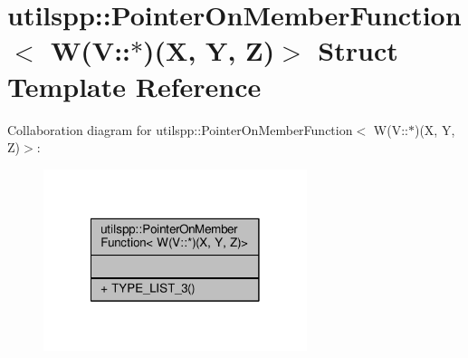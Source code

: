 \hypertarget{structutilspp_1_1PointerOnMemberFunction_3_01W_07V_1_1_5_08_07X_00_01Y_00_01Z_08_4}{\section{utilspp\-:\-:Pointer\-On\-Member\-Function$<$ W(V\-:\-:$\ast$)(X, Y, Z)$>$ Struct Template Reference}
\label{structutilspp_1_1PointerOnMemberFunction_3_01W_07V_1_1_5_08_07X_00_01Y_00_01Z_08_4}
}


Collaboration diagram for utilspp\-:\-:Pointer\-On\-Member\-Function$<$ W(V\-:\-:$\ast$)(X, Y, Z)$>$\-:
\nopagebreak
\begin{figure}[H]
\begin{center}
\leavevmode
\includegraphics[width=218pt]{structutilspp_1_1PointerOnMemberFunction_3_01W_07V_1_1_5_08_07X_00_01Y_00_01Z_08_4__coll__graph}
\end{center}
\end{figure}
